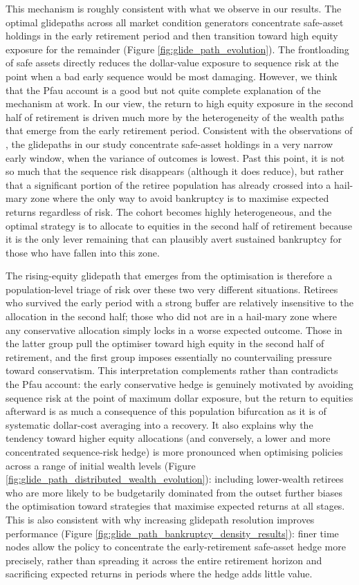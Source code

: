 \documentclass[11pt]{article}
\begin{document}
This mechanism is roughly consistent with what we observe in our results. The optimal glidepaths across all market condition generators concentrate safe-asset holdings in the early retirement period and then transition toward high equity exposure for the remainder (Figure \ref{fig:glide_path_evolution}). The frontloading of safe assets directly reduces the dollar-value exposure to sequence risk at the point when a bad early sequence would be most damaging. However, we think that the Pfau account is a good but not quite complete explanation of the mechanism at work. In our view, the return to high equity exposure in the second half of retirement is driven much more by the heterogeneity of the wealth paths that emerge from the early retirement period. Consistent with the observations of \textcite{anarkulova2025beyond}, the glidepaths in our study concentrate safe-asset holdings in a very narrow early window, when the variance of outcomes is lowest. Past this point, it is not so much that the sequence risk disappears (although it does reduce), but rather that a significant portion of the retiree population has already crossed into a hail-mary zone where the only way to avoid bankruptcy is to maximise expected returns regardless of risk. The cohort becomes highly heterogeneous, and the optimal strategy is to allocate to equities in the second half of retirement because it is the only lever remaining that can plausibly avert sustained bankruptcy for those who have fallen into this zone.

The rising-equity glidepath that emerges from the optimisation is therefore a population-level triage of risk over these two very different situations. Retirees who survived the early period with a strong buffer are relatively insensitive to the allocation in the second half; those who did not are in a hail-mary zone where any conservative allocation simply locks in a worse expected outcome. Those in the latter group pull the optimiser toward high equity in the second half of retirement, and the first group imposes essentially no countervailing pressure toward conservatism. This interpretation complements rather than contradicts the Pfau account: the early conservative hedge is genuinely motivated by avoiding sequence risk at the point of maximum dollar exposure, but the return to equities afterward is as much a consequence of this population bifurcation as it is of systematic dollar-cost averaging into a recovery. It also explains why the tendency toward higher equity allocations (and conversely, a lower and more concentrated sequence-risk hedge) is more pronounced when optimising policies across a range of initial wealth levels (Figure \ref{fig:glide_path_distributed_wealth_evolution}): including lower-wealth retirees who are more likely to be budgetarily dominated from the outset further biases the optimisation toward strategies that maximise expected returns at all stages. This is also consistent with why increasing glidepath resolution improves performance (Figure \ref{fig:glide_path_bankruptcy_density_results}): finer time nodes allow the policy to concentrate the early-retirement safe-asset hedge more precisely, rather than spreading it across the entire retirement horizon and sacrificing expected returns in periods where the hedge adds little value.
\end{document}
